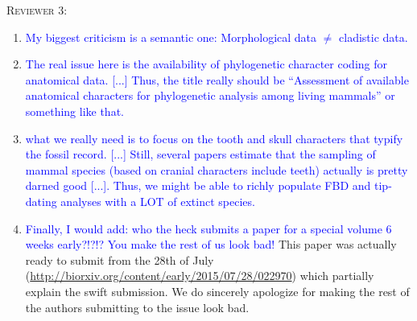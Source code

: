 \documentclass[12pt,letterpaper]{article}
\renewcommand{\section}[1]{%
\bigskip
\begin{center}
\begin{Large}
\normalfont\scshape #1
\medskip
\end{Large}
\end{center}}
\begin{document}

\section{Reviewer 3:}
\begin{enumerate}
\item{\textcolor{blue}{My biggest criticism is a semantic one: Morphological data $\neq$ cladistic data.}}
\item{\textcolor{blue}{The real issue here is the availability of phylogenetic character coding for anatomical data.
[...] Thus, the title really should be ``Assessment of available anatomical characters for phylogenetic analysis among living mammals'' or something like that.}}
\item{\textcolor{blue}{what we really need is to focus on the tooth and skull characters that typify the fossil record.
[...] Still, several papers estimate that the sampling of mammal species (based on cranial characters include teeth) actually is pretty darned good [...].
Thus, we might be able to richly populate FBD and tip-dating analyses with a LOT of extinct species.}}
\item{\textcolor{blue}{Finally, I would add: who the heck submits a paper for a special volume 6 weeks early?!?!? You make the rest of us look bad!}}
This paper was actually ready to submit from the 28th of July (\url{http://biorxiv.org/content/early/2015/07/28/022970}) which partially explain the swift submission.
We do sincerely apologize for making the rest of the authors submitting to the issue look bad.

\end{enumerate}
\end{document}
